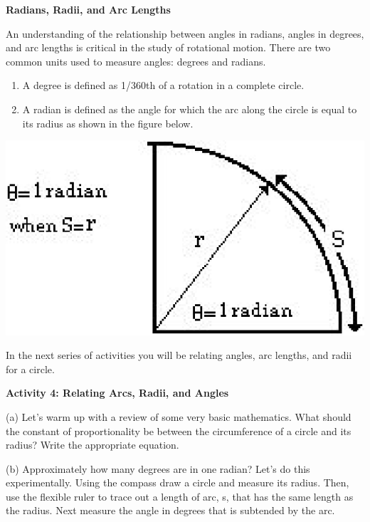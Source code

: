 \textbf{Radians, Radii, and Arc Lengths} 

An understanding of the relationship between angles in radians, angles in degrees, and arc lengths is critical in the study of rotational motion. There are two
common units used to measure angles: degrees and radians.

\begin{enumerate}
\item A degree is defined as 1/360th of a rotation in a complete circle.
\item A radian is defined as the angle for which the arc along the circle is equal to its radius as shown in the figure below.
\end{enumerate}
\vspace{0.3cm}
{\par\centering \includegraphics{rotation_fig7.eps} \par}
\vspace{0.3cm}

In the next series of activities you will be relating angles, arc lengths, and
radii for a circle.

\textbf{Activity 4: Relating Arcs, Radii, and Angles} 

(a) Let's warm up with a review of some very basic mathematics. What should
the constant of proportionality be between the circumference of a circle and
its radius? Write the appropriate equation.
\vspace{10mm}

(b) Approximately how many degrees are in one radian? Let's do this experimentally.
Using the compass draw a circle and measure its radius. Then, use the flexible
ruler to trace out a length of arc, s, that has the same length as the radius.
Next measure the angle in degrees that is subtended by the arc.
\vspace{40mm}

